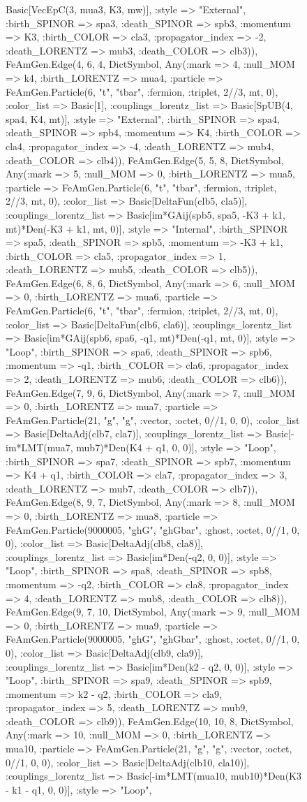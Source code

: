 \documentclass{revtex4}
\begin{document}
\begin{figure}[!htb]
\begin{center}
{Basic[VecEpC(3, mua3, K3, mw)], :style => "External", :birth_SPINOR => spa3, :death_SPINOR => spb3, :momentum => K3, :birth_COLOR => cla3, :propagator_index => -2, :death_LORENTZ => mub3, :death_COLOR => clb3)), FeAmGen.Edge(4, 6, 4, Dict{Symbol, Any}(:mark => 4, :null_MOM => k4, :birth_LORENTZ => mua4, :particle => FeAmGen.Particle(6, "t", "tbar", :fermion, :triplet, 2//3, mt, 0), :color_list => Basic[1], :couplings_lorentz_list => Basic[SpUB(4, spa4, K4, mt)], :style => "External", :birth_SPINOR => spa4, :death_SPINOR => spb4, :momentum => K4, :birth_COLOR => cla4, :propagator_index => -4, :death_LORENTZ => mub4, :death_COLOR => clb4)), FeAmGen.Edge(5, 5, 8, Dict{Symbol, Any}(:mark => 5, :null_MOM => 0, :birth_LORENTZ => mua5, :particle => FeAmGen.Particle(6, "t", "tbar", :fermion, :triplet, 2//3, mt, 0), :color_list => Basic[DeltaFun(clb5, cla5)], :couplings_lorentz_list => Basic[im*GAij(spb5, spa5, -K3 + k1, mt)*Den(-K3 + k1, mt, 0)], :style => "Internal", :birth_SPINOR => spa5, :death_SPINOR => spb5, :momentum => -K3 + k1, :birth_COLOR => cla5, :propagator_index => 1, :death_LORENTZ => mub5, :death_COLOR => clb5)), FeAmGen.Edge(6, 8, 6, Dict{Symbol, Any}(:mark => 6, :null_MOM => 0, :birth_LORENTZ => mua6, :particle => FeAmGen.Particle(6, "t", "tbar", :fermion, :triplet, 2//3, mt, 0), :color_list => Basic[DeltaFun(clb6, cla6)], :couplings_lorentz_list => Basic[im*GAij(spb6, spa6, -q1, mt)*Den(-q1, mt, 0)], :style => "Loop", :birth_SPINOR => spa6, :death_SPINOR => spb6, :momentum => -q1, :birth_COLOR => cla6, :propagator_index => 2, :death_LORENTZ => mub6, :death_COLOR => clb6)), FeAmGen.Edge(7, 9, 6, Dict{Symbol, Any}(:mark => 7, :null_MOM => 0, :birth_LORENTZ => mua7, :particle => FeAmGen.Particle(21, "g", "g", :vector, :octet, 0//1, 0, 0), :color_list => Basic[DeltaAdj(clb7, cla7)], :couplings_lorentz_list => Basic[-im*LMT(mua7, mub7)*Den(K4 + q1, 0, 0)], :style => "Loop", :birth_SPINOR => spa7, :death_SPINOR => spb7, :momentum => K4 + q1, :birth_COLOR => cla7, :propagator_index => 3, :death_LORENTZ => mub7, :death_COLOR => clb7)), FeAmGen.Edge(8, 9, 7, Dict{Symbol, Any}(:mark => 8, :null_MOM => 0, :birth_LORENTZ => mua8, :particle => FeAmGen.Particle(9000005, "ghG", "ghGbar", :ghost, :octet, 0//1, 0, 0), :color_list => Basic[DeltaAdj(clb8, cla8)], :couplings_lorentz_list => Basic[im*Den(-q2, 0, 0)], :style => "Loop", :birth_SPINOR => spa8, :death_SPINOR => spb8, :momentum => -q2, :birth_COLOR => cla8, :propagator_index => 4, :death_LORENTZ => mub8, :death_COLOR => clb8)), FeAmGen.Edge(9, 7, 10, Dict{Symbol, Any}(:mark => 9, :null_MOM => 0, :birth_LORENTZ => mua9, :particle => FeAmGen.Particle(9000005, "ghG", "ghGbar", :ghost, :octet, 0//1, 0, 0), :color_list => Basic[DeltaAdj(clb9, cla9)], :couplings_lorentz_list => Basic[im*Den(k2 - q2, 0, 0)], :style => "Loop", :birth_SPINOR => spa9, :death_SPINOR => spb9, :momentum => k2 - q2, :birth_COLOR => cla9, :propagator_index => 5, :death_LORENTZ => mub9, :death_COLOR => clb9)), FeAmGen.Edge(10, 10, 8, Dict{Symbol, Any}(:mark => 10, :null_MOM => 0, :birth_LORENTZ => mua10, :particle => FeAmGen.Particle(21, "g", "g", :vector, :octet, 0//1, 0, 0), :color_list => Basic[DeltaAdj(clb10, cla10)], :couplings_lorentz_list => Basic[-im*LMT(mua10, mub10)*Den(K3 - k1 - q1, 0, 0)], :style => "Loop", }
\end{center}
\end{figure}
\end{document}
